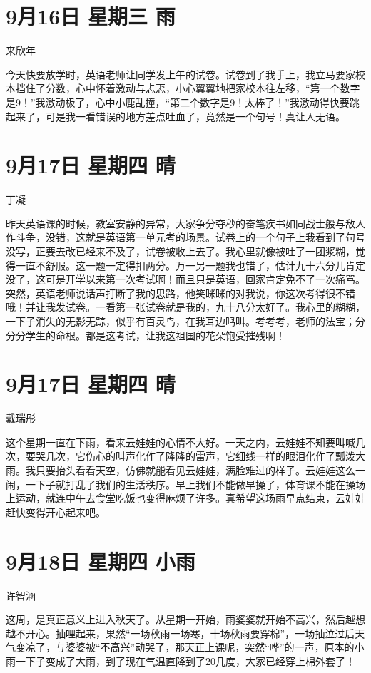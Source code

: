 \section{9月16日 星期三 雨}

来欣年

今天快要放学时，英语老师让同学发上午的试卷。试卷到了我手上，我立马要家校本挡住了分数，心中怀着激动与忐忑，小心翼翼地把家校本往左移，``第一个数字是9！''我激动极了，心中小鹿乱撞，``第二个数字是9！太棒了！''我激动得快要跳起来了，可是我一看错误的地方差点吐血了，竟然是一个句号！真让人无语。

\section{9月17日 星期四 晴}

丁凝

昨天英语课的时候，教室安静的异常，大家争分夺秒的奋笔疾书如同战士般与敌人作斗争，没错，这就是英语第一单元考的场景。试卷上的一个句子上我看到了句号没写，正要去改已经来不及了，试卷被收上去了。我心里就像被吐了一团浆糊，觉得一直不舒服。这一题一定得扣两分。万一另一题我也错了，估计九十六分儿肯定没了，这可是开学以来第一次考试啊！而且只是英语，回家肯定免不了一次痛骂。突然，英语老师说话声打断了我的思路，他笑眯眯的对我说，你这次考得很不错哦！并让我发试卷。一看第一张试卷就是我的，九十八分太好了。我心里的糊糊，一下子消失的无影无踪，似乎有百灵鸟，在我耳边鸣叫。考考考，老师的法宝；分分分学生的命根。都是这考试，让我这祖国的花朵饱受摧残啊！

\section{9月17日 星期四 晴}

戴瑞彤

这个星期一直在下雨，看来云娃娃的心情不大好。一天之内，云娃娃不知要叫喊几次，要哭几次，它伤心的叫声化作了隆隆的雷声，它细线一样的眼泪化作了瓢泼大雨。我只要抬头看看天空，仿佛就能看见云娃娃，满脸难过的样子。云娃娃这么一闹，一下子就打乱了我们的生活秩序。早上我们不能做早操了，体育课不能在操场上运动，就连中午去食堂吃饭也变得麻烦了许多。真希望这场雨早点结束，云娃娃赶快变得开心起来吧。

\section{9月18日 星期四 小雨}

许智涵

这周，是真正意义上进入秋天了。从星期一开始，雨婆婆就开始不高兴，然后越想越不开心。抽哩起来，果然``一场秋雨一场寒，十场秋雨要穿棉''，一场抽泣过后天气变凉了，与婆婆被``不高兴''动哭了，那天正上课呢，突然``哗''的一声，原本的小雨一下子变成了大雨，到了现在气温直降到了20几度，大家已经穿上棉外套了！

